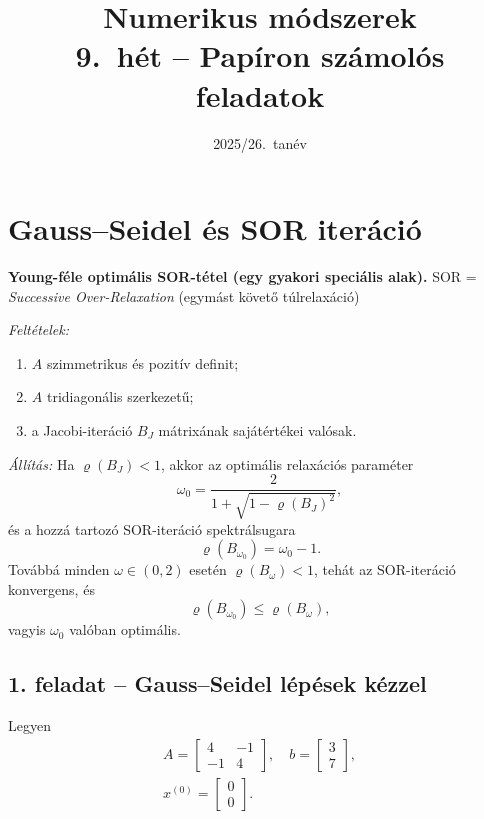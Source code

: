 \documentclass[a4paper,12pt]{article}
\title{\LARGE\bfseries Numerikus módszerek\\[6pt]
  \large 9.\ hét -- Papíron számolós feladatok}
\author{}
\date{2025/26.\ tanév}
\begin{document}

\section{Gauss--Seidel és SOR iteráció}

\begin{mdframed}[backgroundcolor=taskbg,linewidth=0pt,innertopmargin=8pt,innerbottommargin=8pt]
\textbf{Young-féle optimális SOR-tétel (egy gyakori speciális alak).} \quad
{\normalfont\small SOR = \textit{Successive Over-Relaxation} (egymást követő túlrelaxáció)}

\medskip
\textit{Feltételek:}
\begin{enumerate}[noitemsep,topsep=2pt]
  \item $A$ szimmetrikus és pozitív definit;
  \item $A$ tridiagonális szerkezetű;
  \item a Jacobi-iteráció $B_J$ mátrixának sajátértékei valósak.
\end{enumerate}

\medskip
\textit{Állítás:} Ha $\varrho(B_J)<1$, akkor az optimális relaxációs paraméter
\[
  \omega_0 = \frac{2}{1+\sqrt{1-\varrho(B_J)^2}},
\]
és a hozzá tartozó SOR-iteráció spektrálsugara
\[
  \varrho(B_{\omega_0}) = \omega_0 - 1.
\]
Továbbá minden $\omega\in(0,2)$ esetén $\varrho(B_\omega)<1$, tehát az SOR-iteráció konvergens, és
\[
  \varrho(B_{\omega_0}) \le \varrho(B_\omega),
\]
vagyis $\omega_0$ valóban optimális.
\end{mdframed}

\subsection*{1. feladat -- Gauss--Seidel lépések kézzel}

Legyen
\[
\begin{gathered}
A = \begin{bmatrix}4&-1\\-1&4\end{bmatrix},\quad b = \begin{bmatrix}3\\7\end{bmatrix},\\
x^{(0)} = \begin{bmatrix}0\\0\end{bmatrix}.
\end{gathered}
\]
\end{document}
